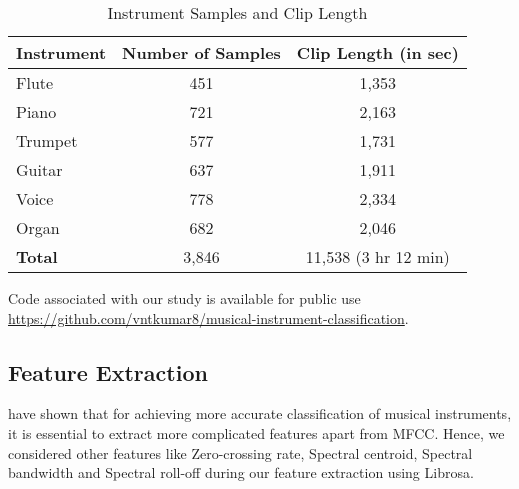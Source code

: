 \documentclass[conference]{IEEEtran}
\begin{document}
\begin{table}[h!]
	\centering
	
	\begin{tabular}{@{}lcc@{}}
		\textbf{Instrument} & \textbf{Number of Samples} & \multicolumn{1}{l}{\textbf{Clip Length (in sec)}}           \\\midrule
		Flute               & 451                        & 1,353                                                        \\
		Piano               & 721                        & 2,163                                                        \\
		Trumpet             & 577                        & 1,731                                                        \\
		Guitar              & 637                        & 1,911                                                        \\
		Voice               & 778                        & 2,334                                                        \\
		Organ               & 682                        & 2,046                                                        \\
		\textbf{Total}               & 3,846                       & 11,538 (3 hr 12 min) 
	\end{tabular}
	\vspace{0.1in}
	\caption{Instrument Samples and Clip Length}
	\label{tab:ic}
\end{table}



Code associated with our study is available for public use
\url{https://github.com/vntkumar8/musical-instrument-classification}.
\subsection{Feature Extraction}
\citet{deng2008study} have shown that for achieving more accurate classification of musical instruments, it is essential to extract more complicated features apart from MFCC. Hence, we considered other features like Zero-crossing rate, Spectral centroid, Spectral bandwidth and Spectral roll-off during our feature extraction using Librosa. 
\end{document}

